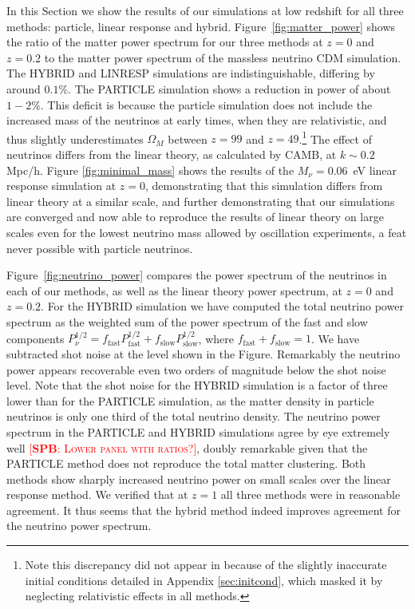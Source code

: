 \documentclass[useAMS, usenatbib]{mnras}
\newcommand{\spb}[1]{{\textsc{\textcolor{red}{[{\bf SPB}: #1]}}}}
\begin{document}
In this Section we show the results of our simulations at low redshift for all three methods: particle, linear response and hybrid. Figure~\ref{fig:matter_power} shows the ratio of the matter power spectrum for our three methods at $z=0$ and $z = 0.2$ to the matter power spectrum of the massless neutrino CDM simulation. The HYBRID and LINRESP simulations are indistinguishable, differing by around $0.1\%$. The PARTICLE simulation shows a reduction in power of about $1-2\%$. This deficit is because the particle simulation does not include the increased mass of the neutrinos at early times, when they are relativistic, and thus slightly underestimates $\Omega_M$ between $z=99$ and $z=49$.\footnote{Note this discrepancy did not appear in \cite{AHB} because of the slightly inaccurate initial conditions detailed in Appendix \ref{sec:initcond}, which masked it by neglecting relativistic effects in all methods.}
The effect of neutrinos differs from the linear theory, as calculated by CAMB, at $k \sim 0.2$ Mpc/h.
Figure \ref{fig:minimal_mass} shows the results of the $M_\nu = 0.06$~eV linear response simulation at $z=0$, demonstrating that this simulation differs from linear theory at a similar scale, and further demonstrating that our simulations are converged and now able to reproduce the results of linear theory on large scales even for the lowest neutrino mass allowed by oscillation experiments, a feat never possible with particle neutrinos.

Figure~\ref{fig:neutrino_power} compares the power spectrum of the neutrinos in each of our methods, as well as the linear theory power spectrum, at $z=0$ and $z=0.2$. For the HYBRID simulation we have computed the total neutrino power spectrum as the weighted sum of the power spectrum of the fast and slow components $P^{1/2}_\nu = f_\mathrm{fast} P^{1/2}_\mathrm{fast} + f_\mathrm{slow} P^{1/2}_\mathrm{slow}$, where $f_\mathrm{fast} + f_\mathrm{slow} = 1$.
We have subtracted shot noise at the level shown in the Figure. Remarkably the neutrino power appears recoverable even two orders of magnitude below the shot noise level. Note that the shot noise for the HYBRID simulation is a factor of three lower than for the PARTICLE simulation, as the matter density in particle neutrinos is only one third of the total neutrino density. The neutrino power spectrum in the PARTICLE and HYBRID simulations agree by eye extremely well \spb{Lower panel with ratios?}, doubly remarkable given that the PARTICLE method does not reproduce the total matter clustering. Both methods show sharply increased neutrino power on small scales over the linear response method. We verified that at $z=1$ all three methods were in reasonable agreement.
It thus seems that the hybrid method indeed improves agreement for the neutrino power spectrum.
\end{document}
